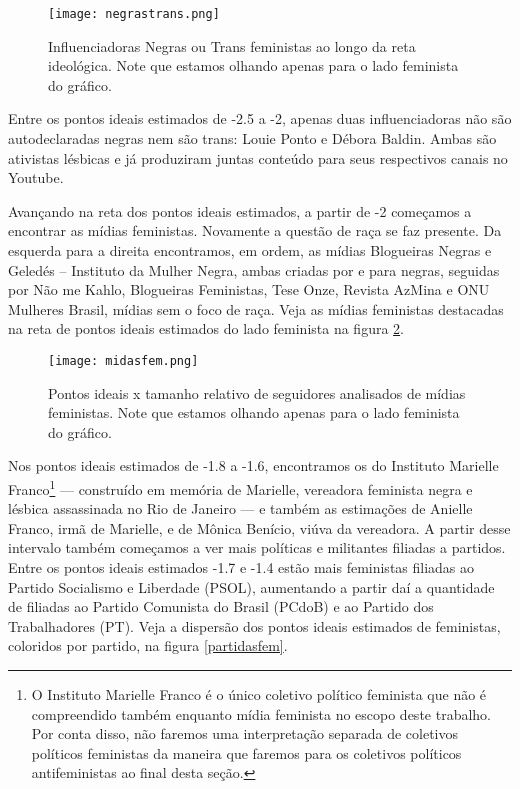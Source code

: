 \documentclass[
	12pt,				%
	openright,			%
	twoside,			%
	a4paper,			%
	english,			%
	brazil				%
	]{abntex2}
\begin{document}
 \begin{figure}[!htbp]
    \centering
    \texttt{[image: negrastrans.png]}
    \caption{Influenciadoras Negras ou Trans feministas ao longo da reta ideológica. Note que estamos olhando apenas para o lado feminista do gráfico.}
    \label{negrastrans}
 \end{figure}
 
 Entre os pontos ideais estimados de -2.5 a -2, apenas duas influenciadoras não são autodeclaradas negras nem são trans: Louie Ponto e Débora Baldin. Ambas são ativistas lésbicas e já produziram juntas conteúdo para seus respectivos canais no Youtube.
 
 Avançando na reta dos pontos ideais estimados, a partir de -2 começamos a encontrar as mídias feministas. Novamente a questão de raça se faz presente. Da esquerda para a direita encontramos, em ordem, as mídias Blogueiras Negras e Geledés -- Instituto da Mulher Negra, ambas criadas por e para negras, seguidas por Não me Kahlo, Blogueiras Feministas, Tese Onze, Revista AzMina e ONU Mulheres Brasil, mídias sem o foco de raça. Veja as mídias feministas destacadas na reta de pontos ideais estimados do lado feminista na figura \ref{midiasfem}.

 \begin{figure}[!htbp]
    \centering
    \texttt{[image: midasfem.png]}
    \caption{Pontos ideais x tamanho relativo de seguidores analisados de mídias feministas. Note que estamos olhando apenas para o lado feminista do gráfico.}
    \label{midiasfem}
 \end{figure}
 
 Nos pontos ideais estimados de -1.8 a -1.6, encontramos os do Instituto Marielle Franco\footnote{O Instituto Marielle Franco é o único coletivo político feminista que não é compreendido também enquanto mídia feminista no escopo deste trabalho. Por conta disso, não faremos uma interpretação separada de coletivos políticos feministas da maneira que faremos para os coletivos políticos antifeministas ao final desta seção.} --- construído em memória de Marielle, vereadora feminista negra e lésbica assassinada no Rio de Janeiro --- e também as estimações de Anielle Franco, irmã de Marielle, e de Mônica Benício, viúva da vereadora. A partir desse intervalo também começamos a ver mais políticas e militantes filiadas a partidos. Entre os pontos ideais estimados -1.7 e -1.4 estão mais feministas filiadas ao Partido Socialismo e Liberdade (PSOL), aumentando a partir daí a quantidade de filiadas ao Partido Comunista do Brasil (PCdoB) e ao Partido dos Trabalhadores (PT). Veja a dispersão dos pontos ideais estimados de feministas, coloridos por partido, na figura \ref{partidasfem}.
\end{document}
